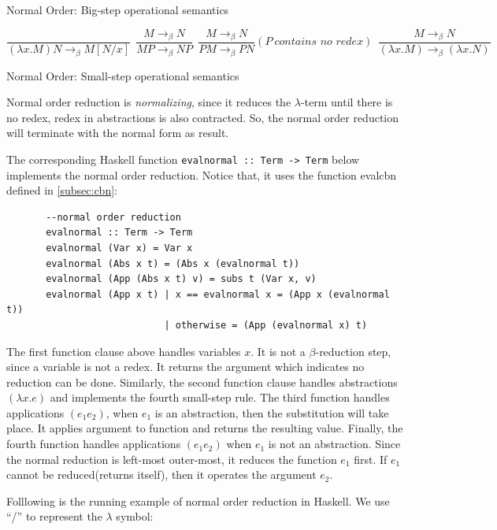 \begin{center}
Normal Order: Big-step operational semantics
\end{center}

\begin{equation*}
\frac{}{(\lambda x.M)N \rightarrow _\beta M[N/x]}\ \  
\frac{M \rightarrow _\beta N}{MP \rightarrow _\beta NP}\ \ 
\frac{M \rightarrow _\beta N}{PM \rightarrow _\beta PN}(P\ \textit{contains no redex})\ \ 
\frac{M \rightarrow _\beta N}{(\lambda x.M) \rightarrow _\beta (\lambda x.N)}
\end{equation*}
\begin{center}
Normal Order: Small-step operational semantics
\end{center}

Normal order reduction is \textit{normalizing}, since it reduces the $\lambda$-term until there is no redex, redex in abstractions is also contracted. So, the normal order reduction will terminate with the normal form as result. 

The corresponding Haskell function \verb|evalnormal :: Term -> Term| below implements the normal order reduction. Notice that, it uses the function evalcbn defined in \ref{subsec:cbn}:

\begin{verbatim}
       --normal order reduction
       evalnormal :: Term -> Term
       evalnormal (Var x) = Var x
       evalnormal (Abs x t) = (Abs x (evalnormal t))
       evalnormal (App (Abs x t) v) = subs t (Var x, v)
       evalnormal (App x t) | x == evalnormal x = (App x (evalnormal t))
                            | otherwise = (App (evalnormal x) t)
\end{verbatim}

The first function clause above handles variables $x$. It is not a $\beta$-reduction step, since a variable is not a redex. It returns the argument which indicates no reduction can be done. Similarly, the second function clause handles abstractions $(\lambda x.e)$ and implements the fourth small-step rule. The third function handles applications $(e_1e_2)$, when $e_1$ is an abstraction, then the substitution will take place. It applies argument to function and returns the resulting value. Finally, the fourth function handles applications $(e_1e_2)$ when $e_1$ is not an abstraction. Since the normal reduction is left-most outer-most, it reduces the function $e_1$ first. If $e_1$ cannot be reduced(returns itself), then it operates the argument $e_2$. 

\begin{exmp}
\normalfont Folllowing is the running example of normal order reduction in Haskell. We use ``/'' to represent the $\lambda$ symbol:
\end{exmp}

